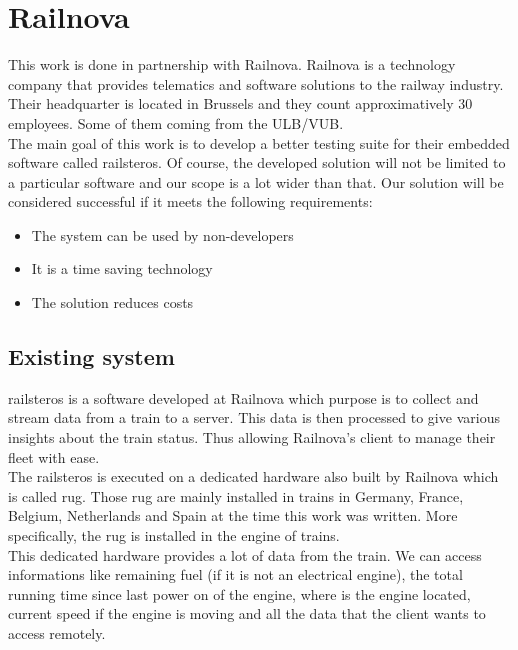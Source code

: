 \documentclass[12pt]{article}
\theoremstyle{definition}
\theoremstyle{definition}
\begin{document}
\clearpage
\section{Railnova}

This work is done in partnership with Railnova. Railnova is a technology company that provides telematics and software solutions to the railway industry. Their headquarter is located in Brussels and they count approximatively 30 employees. Some of them coming from the ULB/VUB.\\

The main goal of this work is to develop a better testing suite for their embedded software called \gls{railsteros}. Of course, the developed solution will not be limited to a particular software and our scope is a lot wider than that. Our solution will be considered successful if it meets the following requirements:

\begin{itemize}
\item The system can be used by non-developers
\item It is a time saving technology
\item The solution reduces costs
\end{itemize}

\subsection{Existing system}

\gls{railsteros} is a software developed at Railnova which purpose is to collect and stream data from a train to a server. This data is then processed to give various insights about the train status. Thus allowing Railnova's client to manage their fleet with ease.\\

The \gls{railsteros} is executed on a dedicated hardware also built by Railnova which is called \gls{rug}. Those \gls{rug} are mainly installed in trains in Germany, France, Belgium, Netherlands and Spain at the time this work was written. More specifically, the \gls{rug} is installed in the engine of trains.\\

This dedicated hardware provides a lot of data from the train. We can access informations like remaining fuel (if it is not an electrical engine), the total running time since last power on of the engine, where is the engine located, current speed if the engine is moving and all the data that the client wants to access remotely.\\
\end{document}
